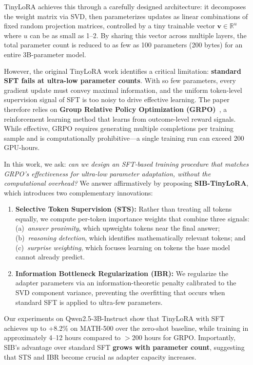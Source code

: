 \documentclass{article}
\newcommand{\R}{\mathbb{R}}
\newcommand{\bv}{\mathbf{v}}
\begin{document}
TinyLoRA achieves this through a carefully designed architecture: it decomposes the weight matrix via SVD, then parameterizes updates as linear combinations of fixed random projection matrices, controlled by a tiny trainable vector $\bv \in \R^u$ where $u$ can be as small as 1--2. By sharing this vector across multiple layers, the total parameter count is reduced to as few as 100 parameters (200 bytes) for an entire 3B-parameter model.

However, the original TinyLoRA work identifies a critical limitation: \textbf{standard SFT fails at ultra-low parameter counts}. With so few parameters, every gradient update must convey maximal information, and the uniform token-level supervision signal of SFT is too noisy to drive effective learning. The paper therefore relies on \textbf{Group Relative Policy Optimization (GRPO)}~\citep{shao2024deepseekmath}, a reinforcement learning method that learns from outcome-level reward signals. While effective, GRPO requires generating multiple completions per training sample and is computationally prohibitive---a single training run can exceed 200 GPU-hours.

In this work, we ask: \textit{can we design an SFT-based training procedure that matches GRPO's effectiveness for ultra-low parameter adaptation, without the computational overhead?} We answer affirmatively by proposing \textbf{SIB-TinyLoRA}, which introduces two complementary innovations:

\begin{enumerate}[leftmargin=*]
  \item \textbf{Selective Token Supervision (STS):} Rather than treating all tokens equally, we compute per-token importance weights that combine three signals: (a)~\textit{answer proximity}, which upweights tokens near the final answer; (b)~\textit{reasoning detection}, which identifies mathematically relevant tokens; and (c)~\textit{surprise weighting}, which focuses learning on tokens the base model cannot already predict.

  \item \textbf{Information Bottleneck Regularization (IBR):} We regularize the adapter parameters via an information-theoretic penalty calibrated to the SVD component variance, preventing the overfitting that occurs when standard SFT is applied to ultra-few parameters.
\end{enumerate}

Our experiments on Qwen2.5-3B-Instruct show that TinyLoRA with SFT achieves up to +8.2\% on MATH-500 over the zero-shot baseline, while training in approximately 4--12 hours compared to $>$200 hours for GRPO. Importantly, SIB's advantage over standard SFT \textbf{grows with parameter count}, suggesting that STS and IBR become crucial as adapter capacity increases.
\end{document}
